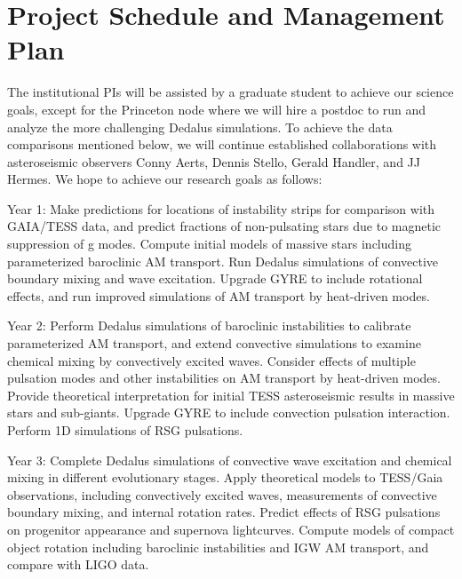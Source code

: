 \section{Project Schedule and Management Plan}

The institutional PIs will be assisted by a graduate student to achieve our science goals, except for the Princeton node where we will hire a postdoc to run and analyze the more challenging Dedalus simulations. To achieve the data comparisons mentioned below, we will continue established collaborations with asteroseismic observers Conny Aerts, Dennis Stello, Gerald Handler, and JJ Hermes. We hope to achieve our research goals as follows:

Year 1: Make predictions for locations of instability strips for comparison with GAIA/TESS data, and predict fractions of non-pulsating stars due to magnetic suppression of g modes. Compute initial models of massive stars including parameterized baroclinic AM transport. Run Dedalus simulations of convective boundary mixing and wave excitation. Upgrade GYRE to include rotational effects, and run improved simulations of AM transport by heat-driven modes. 

Year 2: Perform Dedalus simulations of baroclinic instabilities to calibrate parameterized AM transport, and extend convective simulations to examine chemical mixing by convectively excited waves. Consider effects of multiple pulsation modes and other instabilities on AM transport by heat-driven modes. Provide theoretical interpretation for initial TESS asteroseismic results in massive stars and sub-giants. Upgrade GYRE to include convection pulsation interaction. Perform 1D simulations of RSG pulsations.

Year 3: Complete Dedalus simulations of convective wave excitation and chemical mixing in different evolutionary stages. Apply theoretical models to TESS/Gaia observations, including convectively excited waves, measurements of convective boundary mixing, and internal rotation rates. Predict effects of RSG pulsations on progenitor appearance and supernova lightcurves. Compute models of compact object rotation including baroclinic instabilities and IGW AM transport, and compare with LIGO data.

